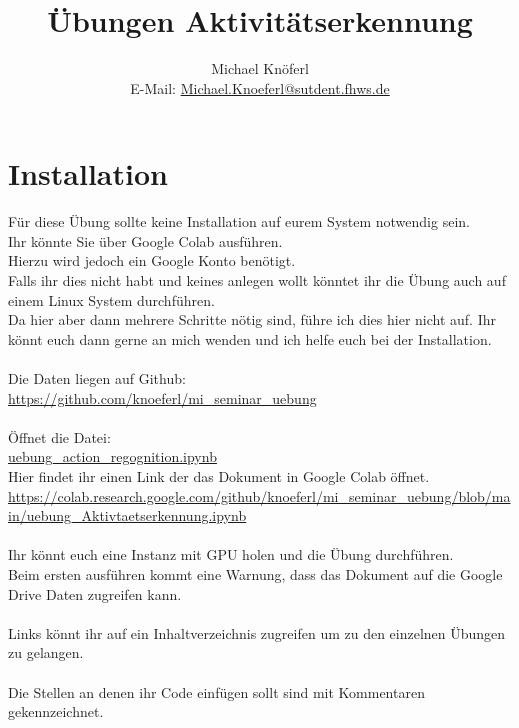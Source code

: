 \documentclass{article}
\title{Übungen Aktivitätserkennung}
\author{Michael Knöferl \\E-Mail: \href{mailto:Michael.Knoeferl@sutdent.fhws.de}{Michael.Knoeferl@sutdent.fhws.de}}
\begin{document}
\maketitle

\section{Installation}

Für diese Übung sollte keine Installation auf eurem System notwendig sein.\\ 
Ihr könnte Sie über Google Colab ausführen. \\Hierzu wird jedoch ein Google Konto benötigt.\\
Falls ihr dies nicht habt und keines anlegen wollt könntet ihr die Übung auch auf einem Linux System durchführen.\\
Da hier aber dann mehrere Schritte nötig sind, führe ich dies hier nicht auf. Ihr könnt euch dann gerne an mich wenden und ich helfe euch bei der Installation.\\ \\ 
Die Daten liegen auf Github:
\\ \href{https://github.com/knoeferl/mi_seminar_uebung}{https://github.com/knoeferl/mi\_seminar\_uebung}\newline
\\ 
\\Öffnet die Datei:
\\ \href{https://github.com/knoeferl/mi_seminar_uebung}{uebung\_action\_regognition.ipynb}\newline
\newline
\\Hier findet ihr einen Link der das Dokument in Google Colab öffnet.\newline
 \href{https://colab.research.google.com/github/knoeferl/mi_seminar_uebung/blob/main/uebung_Aktivtaetserkennung.ipynb}{https://colab.research.google.com/github/knoeferl/mi\_seminar\_uebung/blob/main/uebung\_Aktivtaetserkennung.ipynb}
\\
\\Ihr könnt euch eine Instanz mit GPU holen und die Übung durchführen.
\\Beim ersten ausführen kommt eine Warnung, dass das Dokument auf die Google Drive Daten zugreifen kann.
\\ 
\\Links könnt ihr auf ein Inhaltverzeichnis zugreifen um zu den einzelnen Übungen zu gelangen.
\\ 
\\Die Stellen an denen ihr Code einfügen sollt sind mit Kommentaren gekennzeichnet.
\end{document}
